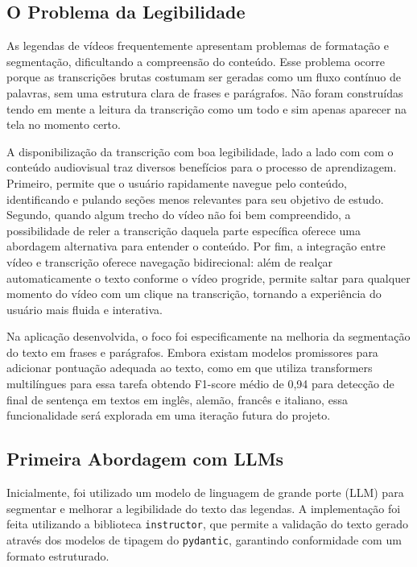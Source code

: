 \documentclass[tcc,capa]{texufpel}
\begin{document}
\subsection{O Problema da Legibilidade}

As legendas de vídeos frequentemente apresentam problemas de formatação e segmentação, dificultando a compreensão do conteúdo. Esse problema ocorre porque as transcrições brutas costumam ser geradas como um fluxo contínuo de palavras, sem uma estrutura clara de frases e parágrafos. Não foram construídas tendo em mente a leitura da transcrição como um todo e sim apenas aparecer na tela no momento certo.

A disponibilização da transcrição com boa legibilidade, lado a lado com com o conteúdo audiovisual traz diversos benefícios para o processo de aprendizagem. Primeiro, permite que o usuário rapidamente navegue pelo conteúdo, identificando e pulando seções menos relevantes para seu objetivo de estudo. Segundo, quando algum trecho do vídeo não foi bem compreendido, a possibilidade de reler a transcrição daquela parte específica oferece uma abordagem alternativa para entender o conteúdo. Por fim, a integração entre vídeo e transcrição oferece navegação bidirecional: além de realçar automaticamente o texto conforme o vídeo progride, permite saltar para qualquer momento do vídeo com um clique na transcrição, tornando a experiência do usuário mais fluida e interativa.

Na aplicação desenvolvida, o foco foi especificamente na melhoria da segmentação do texto em frases e parágrafos. Embora existam modelos promissores para adicionar pontuação adequada ao texto, como em \cite{guhr-EtAl:2021:fullstop} que utiliza transformers multilíngues para essa tarefa obtendo F1-score médio de 0,94 para detecção de final de sentença em textos em inglês, alemão, francês e italiano, essa funcionalidade será explorada em uma iteração futura do projeto.







\subsection{Primeira Abordagem com LLMs}
Inicialmente, foi utilizado um modelo de linguagem de grande porte (LLM) para segmentar e melhorar a legibilidade do texto das legendas. A implementação foi feita utilizando a biblioteca \texttt{instructor}, que permite a validação do texto gerado através dos modelos de tipagem do \texttt{pydantic}, garantindo conformidade com um formato estruturado.
\end{document}
